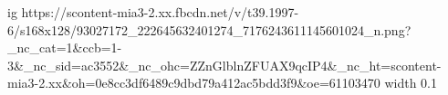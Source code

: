  
 
 
 
 
\ifcmt
  ig https://scontent-mia3-2.xx.fbcdn.net/v/t39.1997-6/s168x128/93027172_222645632401274_7176243611145601024_n.png?_nc_cat=1&ccb=1-3&_nc_sid=ac3552&_nc_ohc=ZZnGlblnZFUAX9qcIP4&_nc_ht=scontent-mia3-2.xx&oh=0e8cc3df6489c9dbd79a412ac5bdd3f9&oe=61103470
  width 0.1
\fi
